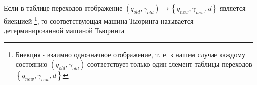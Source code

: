 \begin{definition}
Если в таблице переходов отображение
\(
\left(q_{old}, \gamma_{old}\right) \rightarrow 
\left\{q_{new}, \gamma_{new}, d\right\}
\)
является биекцией 
\footnote{Биекция - взаимно однозначное отображение, т. е. в нашем
  случае каждому состоянию $\left(q_{old}, \gamma_{old}\right)$
  соответствует только один элемент таблицы переходов 
  $\left\{q_{new}, \gamma_{new}, d\right\}$
},
то соответствующая машина Тьюринга
называется детерминированной машиной Тьюринга
\label{defAlgoDMT}
\end{definition}



